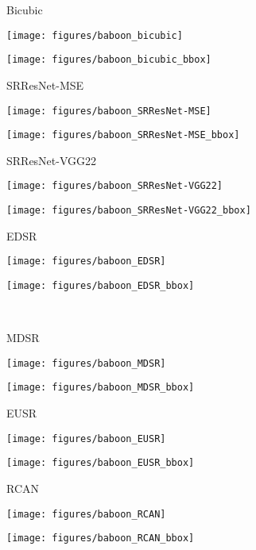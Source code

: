 \documentclass[runningheads]{llncs}
\begin{document}
\begin{figure*}[]
	\centering
	\begin{minipage}[b]{0.24\linewidth}
		\centering
		\centerline{\scriptsize{Bicubic}}\medskip
		\centerline{\texttt{[image: figures/baboon\_bicubic]}}\smallskip
		\centerline{\texttt{[image: figures/baboon\_bicubic\_bbox]}}
	\end{minipage}
	\begin{minipage}[b]{0.24\linewidth}
		\centering
		\centerline{\scriptsize{SRResNet-MSE}}\medskip
		\centerline{\texttt{[image: figures/baboon\_SRResNet-MSE]}}\smallskip
		\centerline{\texttt{[image: figures/baboon\_SRResNet-MSE\_bbox]}}
	\end{minipage}
	\begin{minipage}[b]{0.24\linewidth}
		\centering
		\centerline{\scriptsize{SRResNet-VGG22}}\medskip
		\centerline{\texttt{[image: figures/baboon\_SRResNet-VGG22]}}\smallskip
		\centerline{\texttt{[image: figures/baboon\_SRResNet-VGG22\_bbox]}}
	\end{minipage}
	\begin{minipage}[b]{0.24\linewidth}
		\centering
		\centerline{\scriptsize{EDSR}}\medskip
		\centerline{\texttt{[image: figures/baboon\_EDSR]}}\smallskip
		\centerline{\texttt{[image: figures/baboon\_EDSR\_bbox]}}
	\end{minipage}
	\medskip \\ \medskip
	\begin{minipage}[b]{0.24\linewidth}
		\centering
		\centerline{\scriptsize{MDSR}}\medskip
		\centerline{\texttt{[image: figures/baboon\_MDSR]}}\smallskip
		\centerline{\texttt{[image: figures/baboon\_MDSR\_bbox]}}
	\end{minipage}
	\begin{minipage}[b]{0.24\linewidth}
		\centering
		\centerline{\scriptsize{EUSR}}\medskip
		\centerline{\texttt{[image: figures/baboon\_EUSR]}}\smallskip
		\centerline{\texttt{[image: figures/baboon\_EUSR\_bbox]}}
	\end{minipage}
	\begin{minipage}[b]{0.24\linewidth}
		\centering
		\centerline{\scriptsize{RCAN}}\medskip
		\centerline{\texttt{[image: figures/baboon\_RCAN]}}\smallskip
		\centerline{\texttt{[image: figures/baboon\_RCAN\_bbox]}}

\end{minipage}
\end{figure*}
\end{document}
